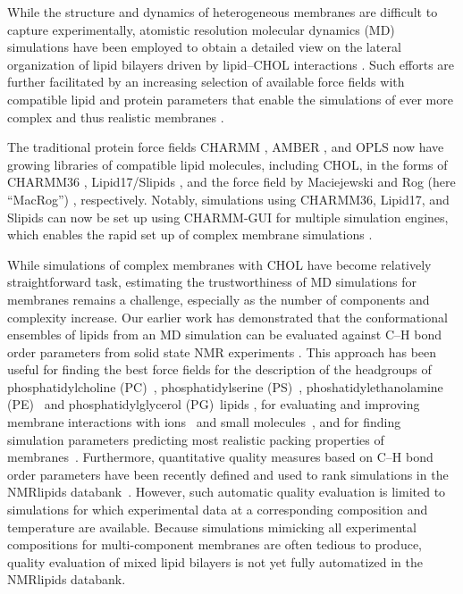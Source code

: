 \documentclass[journal=jctcce]{achemso}
\begin{document}
While the structure and dynamics of heterogeneous membranes are difficult to capture experimentally, atomistic resolution molecular dynamics (MD) simulations have been employed to obtain a detailed view on the lateral organization of lipid bilayers driven by lipid--CHOL interactions \cite{rog14,rog2009ordering,berkowitz2009detailed,enkavi2019multiscale,marrink2019computational}. Such efforts are further facilitated by an increasing selection of available force fields with compatible lipid and protein parameters that enable the simulations of ever more complex and thus realistic membranes \cite{lorent2020plasma}. 

The traditional protein force fields CHARMM \cite{brooks1983charmm}, AMBER \cite{cornell1995second}, and OPLS \cite{jorgensen1988opls,harder2016opls3} now have growing libraries of compatible lipid molecules, including CHOL, in the forms of CHARMM36 \cite{Klauda06,lim12}, Lipid17/Slipids \cite{dickson14,madej15,jambeck12,jambeck12b,jambeck13b,grote2020optimization}, and the force field by Maciejewski and Rog (here ``MacRog'') \cite{maciejewski14,kulig14,kulig15,Kulig16}, respectively. Notably, simulations using CHARMM36, Lipid17, and Slipids can now be set up using CHARMM-GUI for multiple simulation engines, which enables the rapid set up of complex membrane simulations \cite{lee16,lee2020charmm}. 

While simulations of complex membranes with CHOL have become relatively straightforward task, estimating the trustworthiness of MD simulations for membranes remains a challenge, especially as the number of components and complexity increase. Our earlier work has demonstrated that the conformational ensembles of lipids from an MD simulation can be evaluated against C--H bond order parameters from solid state NMR experiments \cite{botan15,ollila16,catte2016molecular,antila2019headgroup,bacle2021inverse}. This approach has been useful for finding the best force fields for the description of the headgroups of phosphatidylcholine (PC)~\cite{botan15}, phosphatidylserine (PS)~\cite{antila2019headgroup}, phoshatidylethanolamine (PE)~\cite{bacle2021inverse} and phosphatidylglycerol (PG)~lipids \cite{bacle2021inverse}, for evaluating and improving membrane interactions with ions~\cite{catte2016molecular,antila2019headgroup,bacle2021inverse,melcr18,melcr19} and small molecules~\cite{nencini22}, and for finding simulation parameters predicting most realistic packing properties of membranes~\cite{antila2022emerging,NMRlipidsDatabank}. Furthermore, quantitative quality measures based on C--H bond order parameters have been recently defined and used to rank simulations in the NMRlipids databank~\cite{NMRlipidsDatabank}. However, such automatic quality evaluation is limited to simulations for which experimental data at a corresponding composition and temperature are available. Because simulations mimicking all experimental compositions for multi-component membranes are often tedious to produce, quality evaluation of mixed lipid bilayers is not yet fully automatized in the NMRlipids databank. 
\end{document}
